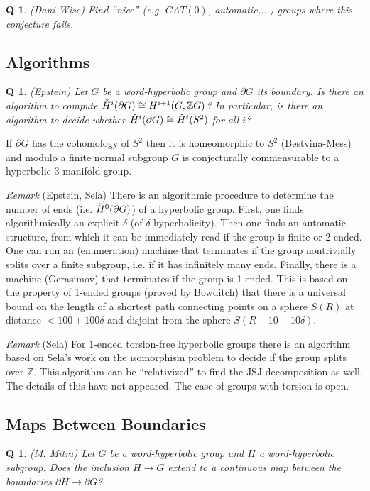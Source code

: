 \documentclass[11pt]{article}
\newtheorem{q}[thm]{Q}
\theoremstyle{remark}
\def\b{\begin{q}}
\def\e{\end{q}}
\def\Z{{\mathbb Z}}
\newcommand{\<}{\langle}
\renewcommand{\>}{\rangle}
\begin{document}
\b (Dani Wise)
Find ``nice'' (e.g. $CAT(0)$, automatic,...) groups where this
conjecture fails.\e

\subsection{Algorithms}

\b (Epstein) Let $G$ be a word-hyperbolic group and $\partial G$ its boundary.
Is there an algorithm to compute $\mathaccent20{H}^i(\partial G)\cong
H^{i+1}(G,\Z G)$? In particular, is there an algorithm to decide whether
$\mathaccent20{H}^i(\partial G)\cong \mathaccent20{H}^i(S^2)$ for all $i$? 
\e
If
$\partial G$ has the cohomology of $S^2$ then it is homeomorphic to $S^2$
(Bestvina-Mess) and modulo a finite normal subgroup $G$ is conjecturally
commensurable to a hyperbolic 3-manifold group. 

{\it Remark} (Epstein, Sela) There is an algorithmic procedure to determine
the number of ends (i.e. $\mathaccent20{H}^0(\partial G)$) of a hyperbolic
group. First, one finds algorithmically an explicit $\delta$ (of
$\delta$-hyperbolicity). Then one finds an automatic structure, from which it
can be immediately read if the group is finite or 2-ended. One can run an
(enumeration) machine that terminates if the group nontrivially splits over a
finite subgroup, i.e. if it has infinitely many ends. Finally, there is a
machine (Gerasimov) that terminates if the group is 1-ended. This is based on
the property of 1-ended groups (proved by Bowditch) that there is a universal
bound on the length of a shortest path connecting points on a sphere $S(R)$ at
distance $<100+100\delta$ and disjoint from the sphere $S(R-10-10\delta)$.

{\it Remark} (Sela)
For 1-ended torsion-free hyperbolic groups there is an algorithm
based on Sela's work on the isomorphism problem to decide if the group splits
over $\Z$. This algorithm can be ``relativized'' to find the JSJ decomposition
as well. The details of this have not appeared. The case of groups with
torsion is open. 



\subsection{Maps Between Boundaries}

\b
(M. Mitra) Let $G$ be a word-hyperbolic group and $H$ a
word-hyperbolic subgroup. Does the inclusion $H\to G$ extend to a
continuous map between the boundaries $\partial H\to\partial G$? \e
\end{document}
